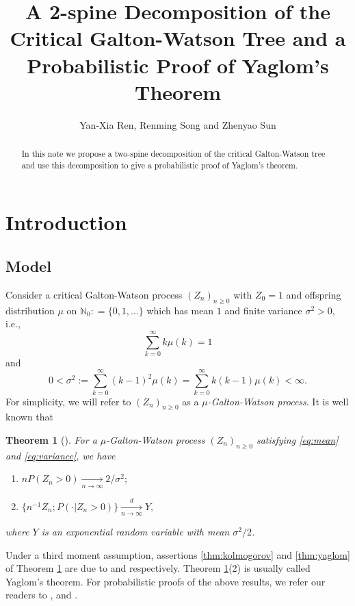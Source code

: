 \documentclass[12pt,a4paper]{amsart}
\title[A 2-spine decomposition and Yaglom's theorem]
{\large A 2-spine Decomposition of the Critical Galton-Watson Tree and a Probabilistic Proof of Yaglom's Theorem}
\author{Yan-Xia Ren, Renming Song and Zhenyao Sun}
\newtheorem{thm}{Theorem}[section]
\numberwithin{equation}{section}
\begin{document}
\begin{abstract}
	In this note  we propose a two-spine decomposition of the critical Galton-Watson tree and use this decomposition to give a probabilistic proof of Yaglom's theorem.
\end{abstract}
\maketitle	
\section{Introduction}
\subsection{Model}
\label{sec:model}
	Consider a critical Galton-Watson process
	$(Z_n)_{n\ge 0}$ 
	with $Z_0 = 1$
	and offspring distribution $\mu$ on $\mathbb N_0 : = \{0,1,\dots\}$ which has mean $1$ and finite variance $\sigma^2>0$, i.e.,
\begin{equation}\label{eq:mean}
 \sum_{k=0}^\infty k \mu(k)	=1
\end{equation}
	and
\begin{equation}\label{eq:variance}
	0	
	<	\sigma^2
	:=	\sum_{k=0}^\infty  (k-1)^2 \mu(k)
	=	\sum_{k=0}^\infty k(k-1) \mu(k)
	<	\infty.
\end{equation}
	For simplicity, 
	we will refer to $(Z_n)_{n\geq 0}$ as 
	a  \emph{$\mu$-Galton-Watson process}.
	It is well known that
\begin{thm}[\cite{kesten1966galton}] \label{thm: Kolmogrov and Yaglom theorem}
	For a $\mu$-Galton-Watson 
	process $(Z_n)_{n\geq 0}$
	satisfying \eqref{eq:mean} and \eqref{eq:variance}, we have
\begin{enumerate}
\item \label{thm:kolmogorov}
	 $n P (Z_n>0) \xrightarrow[n \to \infty]{} 2/\sigma^2;$
\item \label{thm:yaglom}
	$\{n^{-1}Z_n; P(\cdot | Z_n>0)\}\xrightarrow[n \to \infty]{d} Y,$
\end{enumerate}
	where $Y$ is an exponential random variable with mean $\sigma^2/2$.
\end{thm}

	Under a third moment assumption, assertions \eqref{thm:kolmogorov} and \eqref{thm:yaglom} of Theorem \ref{thm: Kolmogrov and Yaglom theorem} are due to \cite{kolmogorov1938losung} and \cite{yaglom1947certain} respectively.
	Theorem \ref{thm: Kolmogrov and Yaglom theorem}(2) is usually called Yaglom's theorem.
	For probabilistic proofs of the above results, we refer our readers to
\cite{geiger1999elementary}, \cite{geiger2000new} and \cite{lyons1995conceptual}.
\end{document}
